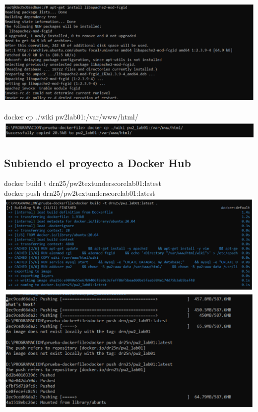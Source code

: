 \documentclass{article}
\begin{document}
\includegraphics[width=\textwidth]{img/c10.png}
\\
\\
docker cp ./wiki pw2lab01:/var/www/html/\\
\includegraphics[width=\textwidth]{img/c11.png}


\subsection{Subiendo el proyecto a Docker Hub}

docker build t drn25/pw2textunderscorelab01:latest\\
docker push drn25/pw2textunderscorelab01:latest\\
\includegraphics[width=\textwidth]{img/c12.png}\\\includegraphics[width=\textwidth]{img/c13.png}
\\
\\
\end{document}
